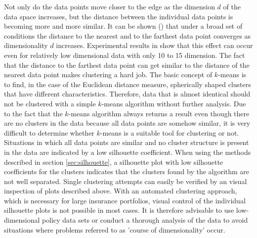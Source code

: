 Not only do the data points move closer to the edge as the dimension $d$ of the data space increases, but the distance between the individual data points is becoming more and more similar. It can be shown (\cite{beyer1999nearest}) that under a broad set of conditions the distance to the nearest and to the farthest data point converges as dimensionality $d$ increases. Experimental results in \cite{beyer1999nearest} show that this effect can occur even for relatively low dimensional data with only 10 to 15 dimension. The fact that the distance to the farthest data point can get similar to the distance of the nearest data point makes clustering a hard job. The basic concept of $k$-means is to find, in the case of the Euclidean distance measure, spherically shaped clusters that have different characteristics. Therefore, data that is almost identical should not be clustered with a simple $k$-means algorithm without further analysis. Due to the fact that the $k$-means algorithm always returns a result even though there are no clusters in the data because all data points are somehow similar, it is very difficult to determine whether $k$-means is a suitable tool for clustering or not. Situations in which all data points are similar and no cluster structure is present in the data are indicated by a low silhouette coefficient. When using the methods described in section \ref{sec:silhouette}, a silhouette plot with low silhouette coefficients for the clusters indicates that the clusters found by the algorithm are not well separated. Single clustering attempts can easily be verified by an visual inspection of plots described above. With an automated clustering approach, which is necessary for large insurance portfolios, visual control of the individual silhouette plots is not possible in most cases. It is therefore advisable to use low-dimensional policy data sets or conduct a thorough analysis of the data to avoid situations where problems referred to as 'course of  dimensionality' occur. 








